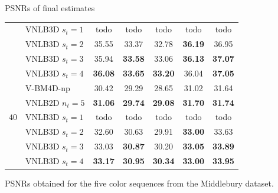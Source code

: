 \documentclass[mathserif, 8pt]{beamer}
\newcommand{\best}[1]{\textbf{\textcolor{MyOrange}{#1}}}
\newcommand{\Best}[1]{\textbf{\textcolor{MyOrangeBrighter}{#1}}}
\begin{document}
\begin{frame}{PSNRs of final estimates}
\begin{center}
{\begin{tabular}{ c | l |c c c c c}
		                      & VNLB3D $s_t = 1$ &       todo   &       todo   &       todo   &       todo   &       todo   \\
		                      & VNLB3D $s_t = 2$ &       35.55  &       33.37  &       32.78  & \Best{36.19} &       36.95  \\
		                      & VNLB3D $s_t = 3$ &       35.94  & \Best{33.58} &       33.06  & \Best{36.13} & \Best{37.07} \\
		                      & VNLB3D $s_t = 4$ & \Best{36.08} & \Best{33.65} & \Best{33.20} &       36.04  & \Best{37.05} \\\hline
%
		\multirow{5}{*}{$40$} & V-BM4D-np        &       30.42  &       29.29  &       28.65  &       31.02  &       31.64  \\
		                      & VNLB2D $n_t = 5$ & \best{31.06} & \best{29.74} & \best{29.08} & \best{31.70} & \best{31.74} \\
		                      & VNLB3D $s_t = 1$ &       todo   &       todo   &       todo   &       todo   &       todo   \\
		                      & VNLB3D $s_t = 2$ &       32.60  &       30.63  &       29.91  & \Best{33.00} &       33.63  \\
		                      & VNLB3D $s_t = 3$ &       33.03  & \Best{30.87} &       30.20  & \Best{33.05} & \Best{33.89} \\
		                      & VNLB3D $s_t = 4$ & \Best{33.17} & \Best{30.95} & \Best{30.34} & \Best{33.00} & \Best{33.95} \\\hline
%
		\end{tabular}}

	\bigskip
	
	PSNRs obtained for the five color sequences from the Middlebury dataset.

	\end{center}






\end{frame}
\end{document}
